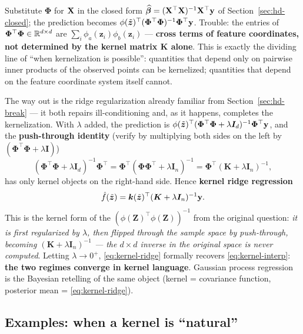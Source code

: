 Substitute $\bm{\Phi}$ for $\mathbf{X}$ in the closed form $\widehat{\bm{\beta}} = (\mathbf{X}^\top\mathbf{X})^{-1}\mathbf{X}^\top\mathbf{y}$ of Section~\ref{sec:hd-closed}; the prediction becomes $\phi(\tilde{\bm{z}})^\top (\bm{\Phi}^\top\bm{\Phi})^{-1} \bm{\Phi}^\top \mathbf{y}$. Trouble: the entries of $\bm{\Phi}^\top\bm{\Phi} \in \mathbb{R}^{d \times d}$ are $\sum_i \phi_a(\bm{z}_i)\phi_b(\bm{z}_i)$ --- \textbf{cross terms of feature coordinates, not determined by the kernel matrix $\bm{K}$ alone}. This is exactly the dividing line of ``when kernelization is possible'': quantities that depend only on pairwise inner products of the observed points can be kernelized; quantities that depend on the feature coordinate system itself cannot.

The way out is the ridge regularization already familiar from Section~\ref{sec:hd-break} --- it both repairs ill-conditioning and, as it happens, completes the kernelization. With $\lambda$ added, the prediction is $\phi(\tilde{\bm{z}})^\top(\bm{\Phi}^\top\bm{\Phi} + \lambda \bm{I}_d)^{-1}\bm{\Phi}^\top\mathbf{y}$, and the \textbf{push-through identity} (verify by multiplying both sides on the left by $(\bm{\Phi}^\top\bm{\Phi} + \lambda\bm{I})$)
\begin{equation}\label{eq:push-through}
  (\bm{\Phi}^\top\bm{\Phi} + \lambda \bm{I}_d)^{-1} \bm{\Phi}^\top
  = \bm{\Phi}^\top (\bm{\Phi}\bm{\Phi}^\top + \lambda \bm{I}_n)^{-1}
  = \bm{\Phi}^\top (\bm{K} + \lambda \bm{I}_n)^{-1},
\end{equation}
has only kernel objects on the right-hand side. Hence \textbf{kernel ridge regression}
\begin{equation}\label{eq:kernel-ridge}
  \hat{f}(\tilde{\bm{z}}) = \bm{k}(\tilde{\bm{z}})^\top (\bm{K} + \lambda \bm{I}_n)^{-1} \mathbf{y} .
\end{equation}
This is the kernel form of the $(\phi(\bm{Z})^\top\phi(\bm{Z}))^{-1}$ from the original question: \textit{it is first regularized by $\lambda$, then flipped through the sample space by push-through, becoming $(\bm{K} + \lambda\bm{I}_n)^{-1}$ --- the $d \times d$ inverse in the original space is never computed}. Letting $\lambda \to 0^+$, \eqref{eq:kernel-ridge} formally recovers \eqref{eq:kernel-interp}: \textbf{the two regimes converge in kernel language}. Gaussian process regression is the Bayesian retelling of the same object (kernel = covariance function, posterior mean = \eqref{eq:kernel-ridge})\cite{scholkopf2002}.

\subsection{Examples: when a kernel is ``natural''}\label{sec:kernel-examples}

